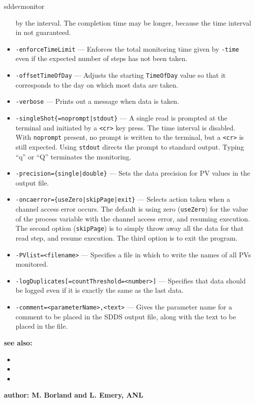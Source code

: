 \begin{sddsprog}{sddsvmonitor}
\begin{itemize}
                by the interval. The completion time may be longer, because the time interval in not guaranteed.
        \item {\tt -enforceTimeLimit} --- Enforces the total monitoring time given by \verb+-time+ even if
                the expected number of steps has not been taken.
        \item {\tt -offsetTimeOfDay} --- Adjusts the starting \verb+TimeOfDay+ value so that it corresponds
                to the day on which most data are taken.
        \item {\tt -verbose} --- Prints out a message when data is taken.
        \item {\verb+-singleShot{=noprompt|stdout}+} --- A single read is prompted at the terminal
                and initiated by a \verb+<cr>+ key press. The time interval is disabled.
                With \verb+noprompt+ present, no prompt is written to the terminal, but a \verb+<cr>+
                is still expected. Using \verb+stdout+ directs the prompt to standard output.
                Typing ``q'' or ``Q'' terminates the monitoring.
        \item {\tt -precision=\{single|double\}} --- Sets the data precision for PV values in the output file.
        \item {\tt -oncaerror=\{useZero|skipPage|exit\}} --- Selects action taken when a channel access error occurs.
                The default is using zero (\verb+useZero+) for the value of the process variable
                with the channel access error, and resuming execution. The second option (\verb+skipPage+) is to
                simply throw away all the data for that read step, and resume execution.
                The third option is to exit the program.
        \item {\tt -PVlist=<filename>} --- Specifies a file in which to write
                the names of all PVs monitored.
        \item {\verb+-logDuplicates[=countThreshold=<number>]+} --- Specifies that data should be
                logged even if it is exactly the same as the last data.
        \item {\verb+-comment=<parameterName>,<text>+} ---
                Gives the parameter name for a comment to be placed in the SDDS output file,
                along with the text to be placed in the file.
    \end{itemize}

\item {\bf see also:}
    \begin{itemize}
%
%
    \item {}
    \item {}
    \item {}
    \end{itemize}
%
%
\item {\bf author: M. Borland and L. Emery, ANL} 
\end{sddsprog}
